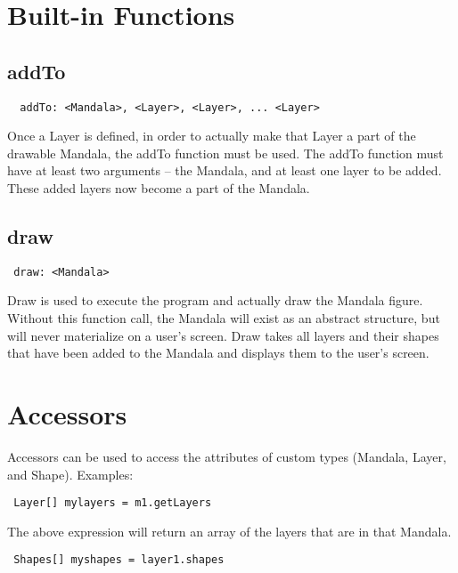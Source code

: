 \documentclass[12pt]{report}
\begin{document}
\newpage
{}
\section*{Built-in Functions}

	\subsection*{addTo} 
  \begin{verbatim}  addTo: <Mandala>, <Layer>, <Layer>, ... <Layer> \end{verbatim}
Once a Layer is defined, in order to actually make that Layer a part of the drawable Mandala, the addTo function must be used. The addTo function must have at least two arguments -- the Mandala, and at least one layer to be added. These added layers now become a part of the Mandala.
    
    \subsection*{draw}
    
    \begin{verbatim} draw: <Mandala> \end{verbatim}
Draw is used to execute the program and actually draw the Mandala figure. Without this function call, the Mandala will exist as an abstract structure, but will never materialize on a user's screen. Draw takes all layers and their shapes that have been added to the Mandala and displays them to the user's screen.

\newpage
{}
\section*{Accessors}

Accessors can be used to access the attributes of custom types (Mandala, Layer, and Shape). Examples:

\begin{verbatim} Layer[] mylayers = m1.getLayers \end{verbatim}

\noindent
The above expression will return an array of the layers that are in that Mandala.

\begin{verbatim} Shapes[] myshapes = layer1.shapes \end{verbatim}
\end{document}
